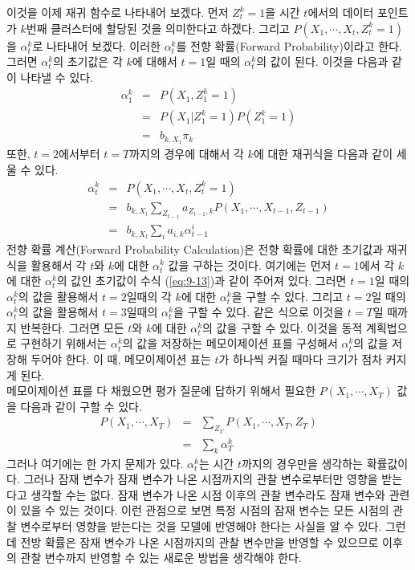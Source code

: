 \documentclass[a4paper]{oblivoir}
\begin{document}
이것을 이제 재귀 함수로 나타내어 보겠다. 먼저 $Z_{t}^{k}=1$을 시간 $t$에서의 데이터 포인트가 $k$번째 클러스터에 할당된 것을 의미한다고 하겠다. 그리고 $P(X_{1},\cdots,X_{t},Z_{t}^{k}=1)$을 $\alpha_{t}^{k}$로 나타내어 보겠다. 이러한 $\alpha_{t}^{k}$를 전향 확률(Forward Probability)이라고 한다. 그러면 $\alpha_{t}^{k}$의 초기값은 각 $k$에 대해서 $t=1$일 때의 $\alpha_{t}^{k}$의 값이 된다. 이것을 다음과 같이 나타낼 수 있다. 
\begin{eqnarray}
\alpha_{1}^{k} & = & P(X_{1},Z_{1}^{k}=1) \nonumber \\
& = &  P(X_{1}|Z_{1}^{k}=1) P(Z_{1}^{k}=1) \nonumber \\
& = &  b_{k,X_{1}} \pi_{k}  \label{eq:9-13} 
\end{eqnarray}
또한, $t=2$에서부터 $t=T$까지의 경우에 대해서 각 $k$에 대한 재귀식을 다음과 같이 세울 수 있다. 
\begin{eqnarray}
\alpha_{t}^{k} & = & P(X_{1},\cdots,X_{t},Z_{t}^{k}=1) \nonumber \\
& = &  b_{k,X_{t}} \sum_{Z_{t-1}} a_{Z_{t-1},k} P(X_{1},\cdots,X_{t-1},Z_{t-1}) \nonumber \\
& = &  b_{k,X_{t}} \sum_{i} a_{i,k} \alpha_{t-1}^{i}  \label{eq:9-14} 
\end{eqnarray}
전향 확률 계산(Forward Probability Calculation)은 전향 확률에 대한 초기값과 재귀식을 활용해서 각 $t$와 $k$에 대한 $\alpha_{t}^{k}$ 값을 구하는 것이다. 여기에는 먼저 $t=1$에서 각 $k$에 대한 $\alpha_{t}^{k}$의 값인 초기값이 수식 (\ref{eq:9-13})과 같이 주어져 있다. 그러면 $t=1$일 때의 $\alpha_{t}^{k}$의 값을 활용해서 $t=2$일때의 각 $k$에 대한 $\alpha_{t}^{k}$을 구할 수 있다. 그리고 $t=2$일 때의 $\alpha_{t}^{k}$의 값을 활용해서 $t=3$일때의 $\alpha_{t}^{k}$을 구할 수 있다. 같은 식으로 이것을 $t=T$일 때까지 반복한다. 그러면 모든 $t$와 $k$에 대한 $\alpha_{t}^{k}$의 값을 구할 수 있다. 이것을 동적 계획법으로 구현하기 위해서는 $\alpha_{t}^{k}$의 값을 저장하는 메모이제이션 표를 구성해서 $\alpha_{t}^{k}$의 값을 저장해 두어야 한다. 이 때, 메모이제이션 표는 $t$가 하나씩 커질 때마다 크기가 점차 커지게 된다. \\ 

메모이제이션 표를 다 채웠으면 평가 질문에 답하기 위해서 필요한 $P(X_{1},\cdots,X_{T})$ 값을 다음과 같이 구할 수 있다. 
\begin{eqnarray}
P(X_{1},\cdots,X_{T}) & = & \sum_{Z_{T}} P(X_{1},\cdots,X_{T},Z_{T})  \nonumber \\
& = & \sum_{k} \alpha_{T}^{k} \label{eq:9-15} 
\end{eqnarray}
그러나 여기에는 한 가지 문제가 있다. $\alpha_{t}^{k}$는 시간 $t$까지의 경우만을 생각하는 확률값이다. 그러나 잠재 변수가 잠재 변수가 나온 시점까지의 관찰 변수로부터만 영향을 받는다고 생각할 수는 없다. 잠재 변수가 나온 시점 이후의 관찰 변수라도 잠재 변수와 관련이 있을 수 있는 것이다. 이런 관점으로 보면 특정 시점의 잠재 변수는 모든 시점의 관찰 변수로부터 영향을 받는다는 것을 모델에 반영해야 한다는 사실을 알 수 있다. 그런데 전방 확률은 잠재 변수가 나온 시점까지의 관찰 변수만을 반영할 수 있으므로 이후의 관찰 변수까지 반영할 수 있는 새로운 방법을 생각해야 한다. \\
\end{document}
